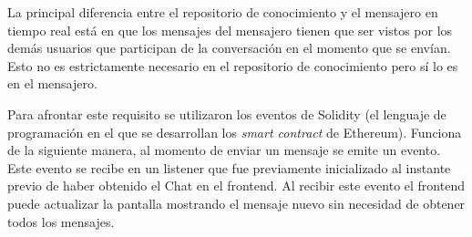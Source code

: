 La principal diferencia entre el repositorio de conocimiento y el mensajero en tiempo real está en que los mensajes del mensajero tienen que ser vistos por los demás usuarios que participan de la conversación en el momento que se envían. Esto no es estrictamente necesario en el repositorio de conocimiento pero sí lo es en el mensajero.

Para afrontar este requisito se utilizaron los eventos de Solidity (el lenguaje de programación en el que se desarrollan los \textit{smart contract} de Ethereum). Funciona de la siguiente manera, al momento de enviar un mensaje se emite un evento. Este evento se recibe en un listener que fue previamente inicializado al instante previo de haber obtenido el Chat en el frontend. Al recibir este evento el frontend puede actualizar la pantalla mostrando el mensaje nuevo sin necesidad de obtener todos los mensajes.

